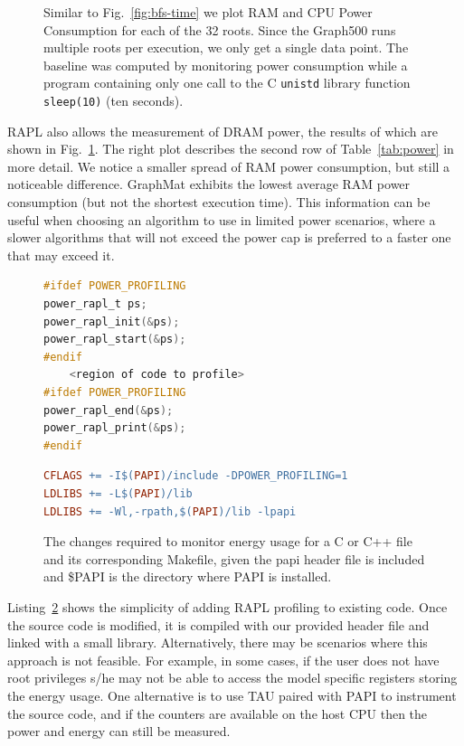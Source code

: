 \documentclass[conference]{IEEEtran}
\begin{document}
\begin{figure}
\begin{minipage}{0.78\linewidth}
	\end{minipage}
	\caption{Similar to Fig.~\ref{fig:bfs-time} we plot RAM and CPU Power Consumption for each of the 32 roots. Since the Graph500 runs multiple roots per execution, we only get a single data point. The baseline was computed by monitoring power consumption while a program containing only one call to the C \texttt{unistd} library function \texttt{sleep(10)} (ten seconds).}
	\label{fig:power}
\end{figure}


RAPL also allows the measurement of DRAM power, the results of which are shown in Fig.~\ref{fig:power}. The right plot describes the second row of Table~\ref{tab:power} in more detail. We notice a smaller spread of RAM power consumption, but still a noticeable difference. GraphMat exhibits the lowest average RAM power consumption (but not the shortest execution time). This information can be useful when choosing an algorithm to use in limited power scenarios, where a slower algorithms that will not exceed the power cap is preferred to a faster one that may exceed it.

\begin{figure}
	\begin{lstlisting}[language=C, frame=single]
#ifdef POWER_PROFILING
power_rapl_t ps;
power_rapl_init(&ps);
power_rapl_start(&ps);
#endif
	<region of code to profile>
#ifdef POWER_PROFILING
power_rapl_end(&ps);
power_rapl_print(&ps);
#endif
	\end{lstlisting}
	\begin{lstlisting}[language=make,  basicstyle=\footnotesize]
CFLAGS += -I$(PAPI)/include -DPOWER_PROFILING=1
LDLIBS += -L$(PAPI)/lib
LDLIBS += -Wl,-rpath,$(PAPI)/lib -lpapi
	\end{lstlisting}
	\caption{The changes required to monitor energy usage for a C or C++ file and its corresponding Makefile, given the papi header file is included and \$PAPI is the directory where PAPI is installed.}
	\label{lst:RAPL}
\end{figure}

Listing~\ref{lst:RAPL} shows the simplicity of adding RAPL profiling to existing code. Once the source code is modified, it is compiled with our provided header file and linked with a small library. Alternatively, there may be scenarios where this approach is not feasible. For example, in some cases, if the user does not have root privileges s/he may not be able to access the model specific registers storing the energy usage. One alternative is to use TAU paired with PAPI to instrument the source code, and if the counters are available on the host CPU then the power and energy can still be measured.
\end{document}
